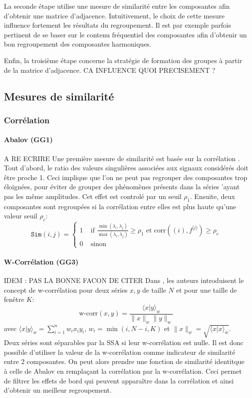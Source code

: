 \documentclass{gretsi}
\begin{document}
La seconde étape utilise une mesure de similarité entre les composantes afin d'obtenir une matrice d'adjacence. Intuitivement, le choix de cette mesure influence fortement les résultats du regroupement. Il est par exemple parfois pertinent de se  baser sur le contenu fréquentiel des composantes afin d'obtenir un bon regroupement des composantes harmoniques.

Enfin, la troisième étape concerne la stratégie de formation des groupes à partir de la matrice d'adjacence. CA INFLUENCE QUOI PRECISEMENT ?

\subsection{Mesures de similarité}
\label{sub:sim}

\subsubsection{Corrélation}

\paragraph{Abalov (GG1)}
\label{par:}
A RE ECRIRE
Une première mesure de similarité est basée sur la corrélation  \cite{abalov_14_aut}. Tout d'abord, le ratio des valeurs singulières associées aux signaux considérés doit être proche 1. Ceci implique que l'on ne peut pas regrouper des composantes trop éloignées, pour éviter de grouper des phénomènes présents dans la séries 'ayant pas les même amplitudes. Cet effet est controlé par un seuil $\rho_1$. Ensuite, deux composantes sont regroupées si la corrélation entre elles est plus haute qu'une valeur seuil $\rho_c$:
$$
\texttt{Sim}(i, j) = \begin{cases}
	1 &\text{ if } \displaystyle\frac{\min(\lambda_i, \lambda_j)}{\max(\lambda_i, \lambda_j)} \ge \rho_1 \text{ et } \text{corr}({(i)}, f^{[j)}) \ge \rho_c\\
	0& \text{ sinon}
\end{cases}
$$

\paragraph{W-Corrélation (GG3)}
\label{par:nn}
IDEM : PAS LA BONNE FACON DE CITER
Dans \cite{GNZ_10_SSA}, les auteurs introduisent le concept de w-corrélation pour deux séries $x, y$ de taille $N$ et pour une taille de fenêtre $K$:$$
\text{w-corr}(x, y) = \frac{\langle x|y\rangle_w}{\|x\|_w\|y\|_w}
$$avec $\langle x|y\rangle_w = \sum_{i=1}^n w_i x_i y_i$, $w_i = \min(i, N-i, K)$ et $\|x\|_w = \sqrt{\langle x|x\rangle_w}$. Deux séries sont séparables par la SSA si leur w-corrélation est nulle. Il est donc possible d'utiliser la valeur de la w-corrélation comme indicateur de similarité entre 2 composantes. On peut alors prendre une fonction de similarité identitque à celle de Abalov en remplaçant la corrélation par la w-corrélation. Ceci permet de filtrer les effets de bord qui peuvent apparaître dans la corrélation et ainsi d'obtenir un meilleur regroupement.
\end{document}
